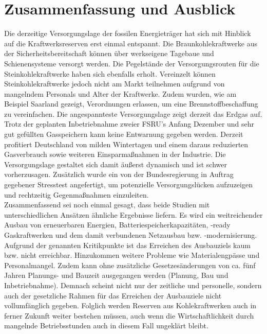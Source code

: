 \section{Zusammenfassung und Ausblick}

	Die derzeitige Versorgungslage der fossilen Energieträger hat sich mit Hinblick auf die Kraftwerksreserven erst einmal entspannt. 
	Die Braunkohlekraftwerke aus der Sicherheitsbereitschaft können über werkseigene Tagebaue und Schienensysteme versorgt werden. 
	Die Pegelstände der Versorgungsrouten für die Steinkohlekraftwerke haben sich ebenfalls erholt. 
	Vereinzelt können Steinkohlekraftwerke jedoch nicht am Markt teilnehmen aufgrund von mangelndem Personals und Alter der Kraftwerke. 
	Zudem wurden, wie am Beispiel Saarland gezeigt, Verordnungen erlassen, um eine Brennstoffbeschaffung zu vereinfachen. 
	Die angespannteste Versorgungslage zeigt derzeit das Erdgas auf. 
	Trotz der geplanten Inbetriebnahme zweier FSRU’s Anfang Dezember und sehr gut gefüllten Gasspeichern kann keine Entwarnung gegeben werden. 
	Derzeit profitiert Deutschland von milden Wintertagen und einem daraus reduzierten Gasverbrauch sowie weiteren Einsparmaßnahmen in der Industrie. 
	Die Versorgungslage gestaltet sich damit äußerst dynamisch und ist schwer vorherzusagen. 
	Zusätzlich wurde ein von der Bundesregierung in Auftrag gegebener Stresstest angefertigt, um potenzielle Versorgungslücken aufzuzeigen und rechtzeitig Gegenmaßnahmen einzuleiten. \\
	
	Zusammenfassend sei noch einmal gesagt, dass beide Studien mit unterschiedlichen Ansätzen ähnliche Ergebnisse liefern. 
	Es wird ein weitreichender Ausbau von erneuerbaren Energien, Batteriespeicherkapazitäten, \Htwo-ready Gaskraftwerken und dem damit verbundenen Netzausbau bzw. -modernisierung. \\
	
	
	Aufgrund der genannten Kritikpunkte ist das Erreichen des Ausbauziels kaum bzw. nicht erreichbar. Hinzukommen weitere Probleme wie Materialengpässe und Personalmangel.
	Zudem kann ohne zusätzliche Gesetzesänderungen von ca. fünf Jahren Planungs- und Bauzeit ausgegangen werden (Planung, Bau und Inbetriebnahme).
	Demnach scheint nicht nur der zeitliche und personelle, sondern auch der gesetzliche Rahmen für das Erreichen der Ausbauziele nicht vollumfänglich gegeben.
	Folglich werden Reserven aus Kohlekraftwerken auch in ferner Zukunft weiter bestehen müssen, auch wenn die Wirtschaftlichkeit durch mangelnde Betriebsstunden auch in diesem Fall ungeklärt bleibt.
	
	
	
	
